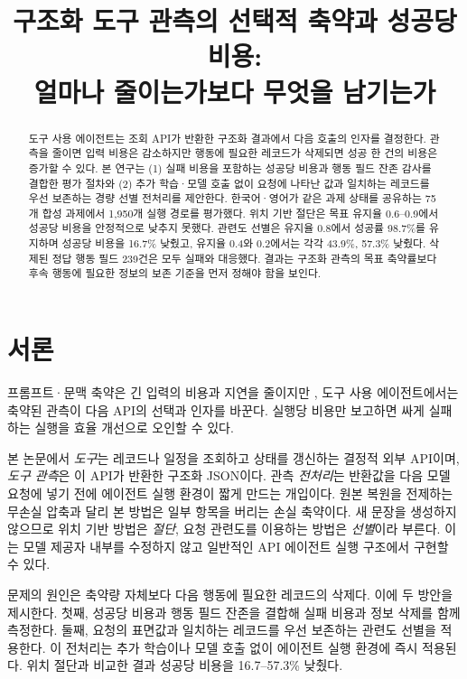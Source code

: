 \documentclass[10pt,twocolumn]{article}
\title{구조화 도구 관측의 선택적 축약과 성공당 비용:\\얼마나 줄이는가보다 무엇을 남기는가}
\author{}
\date{}
\begin{document}
\maketitle

\begin{abstract}
도구 사용 에이전트는 조회 API가 반환한 구조화 결과에서 다음 호출의 인자를
결정한다. 관측을 줄이면 입력 비용은 감소하지만 행동에 필요한 레코드가 삭제되면
성공 한 건의 비용은 증가할 수 있다. 본 연구는 (1) 실패 비용을 포함하는 성공당
비용과 행동 필드 잔존 감사를 결합한 평가 절차와 (2) 추가 학습·모델 호출 없이
요청에 나타난 값과 일치하는 레코드를 우선 보존하는 경량 선별 전처리를 제안한다.
한국어·영어가 같은 과제 상태를 공유하는 75개 합성 과제에서 1,950개 실행 경로를
평가했다. 위치 기반 절단은 목표 유지율 0.6--0.9에서 성공당 비용을 안정적으로
낮추지 못했다. 관련도 선별은 유지율 0.8에서 성공률 98.7\%를 유지하며 성공당
비용을 16.7\% 낮췄고, 유지율 0.4와 0.2에서는 각각 43.9\%, 57.3\% 낮췄다.
삭제된 정답 행동 필드 239건은 모두 실패와 대응했다. 결과는 구조화 관측의 목표
축약률보다 후속 행동에 필요한 정보의 보존 기준을 먼저 정해야 함을 보인다.
\end{abstract}

\section{서론}
프롬프트·문맥 축약은 긴 입력의 비용과 지연을 줄이지만
\cite{jiang2023llmlingua,jiang2024longllmlingua,pan2024llmlingua2}, 도구 사용
에이전트에서는 축약된 관측이 다음 API의 선택과 인자를 바꾼다. 실행당 비용만
보고하면 싸게 실패하는 실행을 효율 개선으로 오인할 수 있다.

본 논문에서 \textit{도구}는 레코드나 일정을 조회하고 상태를 갱신하는 결정적
외부 API이며, \textit{도구 관측}은 이 API가 반환한 구조화 JSON이다. 관측
\textit{전처리}는 반환값을 다음 모델 요청에 넣기 전에 에이전트 실행 환경이
짧게 만드는 개입이다. 원본 복원을 전제하는 무손실 압축과 달리 본 방법은
일부 항목을 버리는 손실 축약이다. 새 문장을 생성하지 않으므로 위치 기반
방법은 \textit{절단}, 요청 관련도를 이용하는 방법은 \textit{선별}이라 부른다.
이는 모델 제공자 내부를 수정하지 않고 일반적인 API 에이전트 실행 구조에서 구현할 수 있다.

문제의 원인은 축약량 자체보다 다음 행동에 필요한 레코드의 삭제다. 이에 두
방안을 제시한다. 첫째, 성공당 비용과 행동 필드 잔존을 결합해 실패 비용과 정보
삭제를 함께 측정한다. 둘째, 요청의 표면값과 일치하는 레코드를 우선 보존하는
관련도 선별을 적용한다. 이 전처리는 추가 학습이나 모델 호출 없이 에이전트 실행
환경에 즉시 적용된다. 위치 절단과 비교한 결과 성공당 비용을 16.7--57.3\%
낮췄다.
\end{document}
